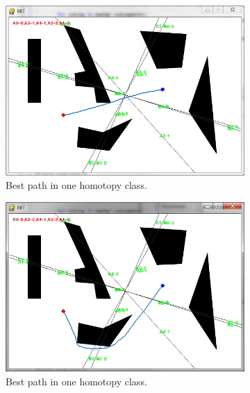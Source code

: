 \documentclass[letterpaper, 10 pt, conference]{ieeeconf}
\begin{document}
\begin{figure}
	\centering
	\begin{subfigure}[t]{0.47\linewidth}
		\centering
		\includegraphics[width=\textwidth]{fig/screenshot1/all_homotopy1.png}
		\caption{Best path in one homotopy class.}
		\label{fig:all_homotopy:01}
	\end{subfigure}  
	\begin{subfigure}[t]{0.47\linewidth}
		\centering
		\includegraphics[width=\textwidth]{fig/screenshot1/all_homotopy2.png}
		\caption{Best path in one homotopy class.}
		\label{fig:all_homotopy:02}
	\end{subfigure}
	\\
	\begin{subfigure}[t]{0.47\linewidth}

\end{subfigure}
\end{figure}
\end{document}
